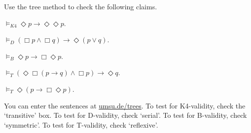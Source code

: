 
\begin{exercise}
  Use the tree method to check the following claims.
  \begin{exlist}
    \item $\models_{K4} \Diamond p \to \Diamond\Diamond p$.
    \item $\models_{D} (\Box p \land \Box q) \to \Diamond (p \lor q)$.
    \item $\models_{B} \Diamond p \to \Box\Diamond p$.
    \item $\models_{T} (\Diamond\Box(p \to q) \land \Box p) \to \Diamond q$.
    \item $\models_{T} \Diamond (p \to \Box \Diamond p)$.
  \end{exlist}
\end{exercise}
\begin{solution}
  You can enter the sentences at
  \href{https://www.umsu.de/trees/}{umsu.de/trees}. To
  test for K4-validity, check the `transitive' box. To test for D-validity, check `serial'. To test for B-validity, check `symmetric'. To test for T-validity, check `reflexive'.
\end{solution}








